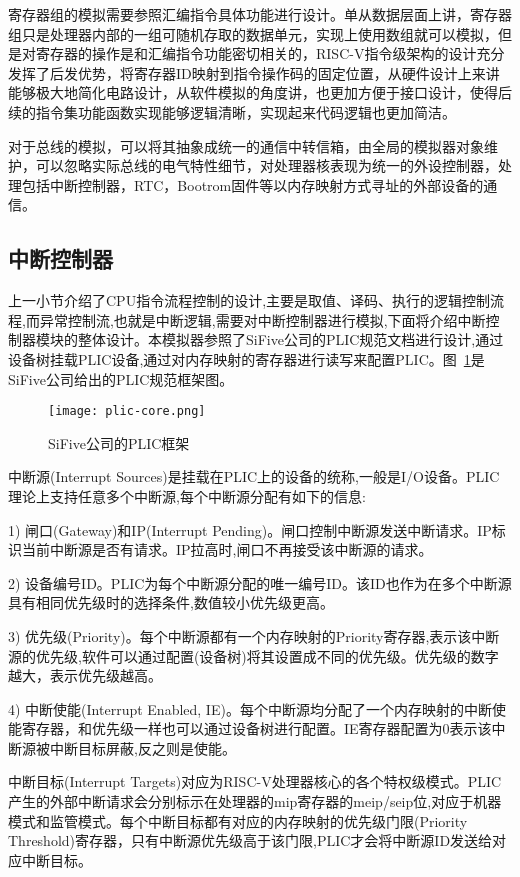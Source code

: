 寄存器组的模拟需要参照汇编指令具体功能进行设计。单从数据层面上讲，寄存器组只是处理器内部的一组可随机存取的数据单元，实现上使用数组就可以模拟，但是对寄存器的操作是和汇编指令功能密切相关的，RISC-V指令级架构的设计充分发挥了后发优势，将寄存器ID映射到指令操作码的固定位置，从硬件设计上来讲能够极大地简化电路设计，从软件模拟的角度讲，也更加方便于接口设计，使得后续的指令集功能函数实现能够逻辑清晰，实现起来代码逻辑也更加简洁。


对于总线的模拟，可以将其抽象成统一的通信中转信箱，由全局的模拟器对象维护，可以忽略实际总线的电气特性细节，对处理器核表现为统一的外设控制器，处理包括中断控制器，RTC，Bootrom固件等以内存映射方式寻址的外部设备的通信。

\subsection{中断控制器}
上一小节介绍了CPU指令流程控制的设计,主要是取值、译码、执行的逻辑控制流程,而异常控制流,也就是中断逻辑,需要对中断控制器进行模拟,下面将介绍中断控制器模块的整体设计。本模拟器参照了SiFive公司的PLIC规范文档进行设计,通过设备树挂载PLIC设备,通过对内存映射的寄存器进行读写来配置PLIC。图~\ref{fig:plic-core}是SiFive公司给出的PLIC规范框架图。
\begin{figure}[H]
    \centering
    \texttt{[image: plic-core.png]}
    \caption{SiFive公司的PLIC框架}
    \label{fig:plic-core}
\end{figure}


中断源(Interrupt Sources)是挂载在PLIC上的设备的统称,一般是I/O设备。PLIC理论上支持任意多个中断源,每个中断源分配有如下的信息:


1) 闸口(Gateway)和IP(Interrupt Pending)。闸口控制中断源发送中断请求。IP标识当前中断源是否有请求。IP拉高时,闸口不再接受该中断源的请求。


2) 设备编号ID。PLIC为每个中断源分配的唯一编号ID。该ID也作为在多个中断源具有相同优先级时的选择条件,数值较小优先级更高。


3) 优先级(Priority)。每个中断源都有一个内存映射的Priority寄存器,表示该中断源的优先级,软件可以通过配置(设备树)将其设置成不同的优先级。优先级的数字越大，表示优先级越高。


4) 中断使能(Interrupt Enabled, IE)。每个中断源均分配了一个内存映射的中断使能寄存器，和优先级一样也可以通过设备树进行配置。IE寄存器配置为0表示该中断源被中断目标屏蔽,反之则是使能。


中断目标(Interrupt Targets)对应为RISC-V处理器核心的各个特权级模式。PLIC产生的外部中断请求会分别标示在处理器的mip寄存器的meip/seip位,对应于机器模式和监管模式。每个中断目标都有对应的内存映射的优先级门限(Priority Threshold)寄存器，只有中断源优先级高于该门限,PLIC才会将中断源ID发送给对应中断目标。



